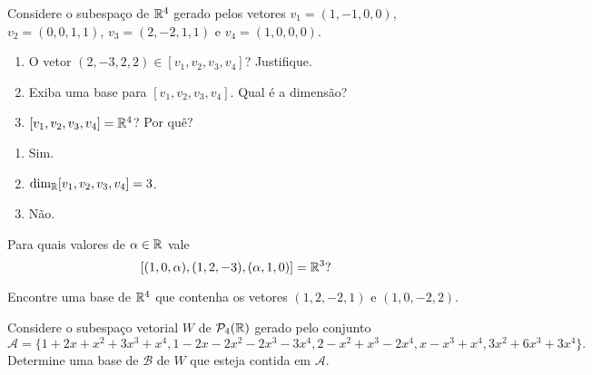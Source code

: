 \documentclass[12pt]{exam}
\begin{document}
\begin{exercicio}
	Considere o subespa\c{c}o de $\mathbb{R}^4$ gerado pelos vetores $v_1 = (1, -1, 0, 0)$, $v_2 = (0, 0, 1, 1)$, $v_3 = (2, -2, 1, 1)$ e $v_4 = (1, 0, 0, 0)$.
	\begin{enumerate}[label={\alph*})]
		\item O vetor $(2, -3, 2, 2) \in [v_1, v_2, v_3, v_4]$? Justifique.
		\item Exiba uma base para $[v_1, v_2, v_3, v_4]$. Qual \'e a dimens\~ao?
		\item $[v_1, v_2, v_3, v_4] = \mathbb{R}^4$? Por qu\^e?
	\end{enumerate}
	\begin{solucao}
		\begin{enumerate}[label={\alph*})]
			\item Sim.
			\item $\dim_{\mathbb{R}} [v_1, v_2, v_3, v_4] = 3$.
			\item N\~ao.
		\end{enumerate}
	\end{solucao}
\end{exercicio}

\begin{exercicio}
	Para quais valores de $\alpha \in \mathbb{R}$ vale
	\[
	[(1, 0, \alpha), (1, 2, -3) , (\alpha, 1, 0)] = \mathbb{R}^3?
	\]
\end{exercicio}

\begin{exercicio}
	Encontre uma base de $\mathbb{R}^4$ que contenha os vetores $(1,2,-2,1)$ e $(1,0,-2,2)$.
\end{exercicio}

\begin{exercicio}
	Considere o subespa\c{c}o vetorial $W$ de $\mathcal{P}_4(\mathbb{R})$ gerado pelo conjunto
	\[
	\mathcal{A} = \{1+2x+x^2+3x^3+x^4, 1-2x-2x^2-2x^3-3x^4,2-x^2+x^3-2x^4,x-x^3+x^4,3x^2+6x^3+3x^4\}.
	\]
	Determine uma base de $\mathcal{B}$ de $W$ que esteja contida em $\mathcal{A}$.
\end{exercicio}

%
\end{document}
